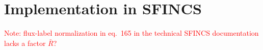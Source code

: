 \documentclass[12pt, a4paper]{article}
\newcommand{\p}{\ensuremath{\partial}}
\renewcommand{\d}{\ensuremath{\mathrm{d}}}
\newcommand{\todo}[1]{\textcolor{red}{#1}}
\newcommand{\lang}{\left\langle}
\newcommand{\rang}{\right\rangle}
\begin{document}



\section{Implementation in SFINCS}
\todo{Note: flux-label normalization in eq.\ 165 in the technical SFINCS documentation lacks a factor $\bar{R}$?}
\end{document}
